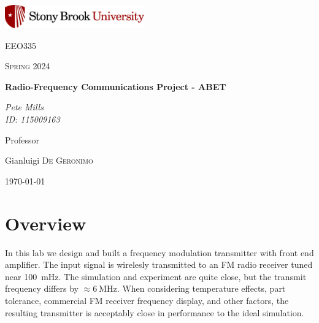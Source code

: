 \documentclass{article}
\begin{document}
	
\begin{titlepage}
	\centering
	\includegraphics[width=0.45\textwidth]{sbu}\par\vspace{1cm}
	{\LARGE \textsc{EEO335}\par}
	\vspace{1cm}
	{\Large \textsc{Spring 2024}\par}
	\vspace{1.5cm}
	{\huge\bfseries Radio-Frequency Communications Project - ABET\par}
	\vspace{2cm}
	{\Large\itshape Pete Mills\\ID: 115009163\par}
	\vfill
	Professor\par
	Gianluigi \textsc{De Geronimo}

	\vfill

	{\large \today\par}
\end{titlepage}

	\newcommand{\assName}{Assignment 7-1.pdf}

	
	
	

	\section*{Overview}
	
	 In this lab we design and built a frequency modulation transmitter with front end amplifier. The input signal is wirelesly transmitted to an FM radio receiver tuned near \SI{100}{\mHz}. The simulation and experiment are quite close, but the transmit frequency differs by $\approx\SI{6}{\MHz}$. When considering temperature effects, part tolerance, commercial FM receiver frequency display, and other factors, the resulting transmitter is acceptably close in performance to the ideal simulation.
	
\end{document}
